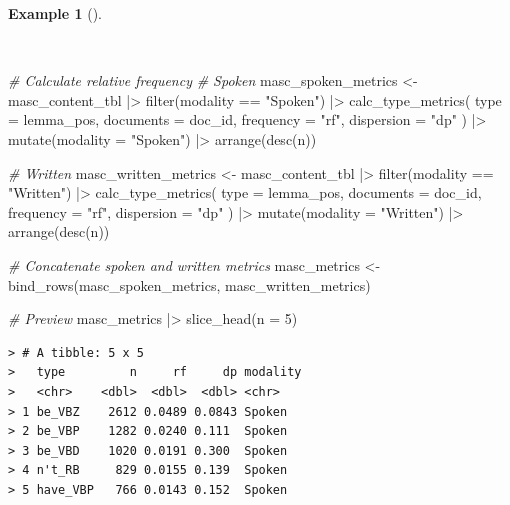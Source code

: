 \documentclass[
  letterpaper,
  DIV=11,
  numbers=noendperiod]{scrreprt}
\newenvironment{Shaded}{\begin{snugshade}}{\end{snugshade}}
\newcommand{\AttributeTok}[1]{\textcolor[rgb]{0.00,0.00,0.00}{#1}}
\newcommand{\CommentTok}[1]{\textcolor[rgb]{0.00,0.00,0.00}{\textit{#1}}}
\newcommand{\DecValTok}[1]{\textcolor[rgb]{0.00,0.00,0.00}{#1}}
\newcommand{\FunctionTok}[1]{\textcolor[rgb]{0.00,0.00,0.00}{#1}}
\newcommand{\NormalTok}[1]{\textcolor[rgb]{0.00,0.00,0.00}{#1}}
\newcommand{\OtherTok}[1]{\textcolor[rgb]{0.00,0.00,0.00}{#1}}
\newcommand{\SpecialCharTok}[1]{\textcolor[rgb]{0.00,0.00,0.00}{#1}}
\newcommand{\StringTok}[1]{\textcolor[rgb]{0.00,0.00,0.00}{#1}}
\theoremstyle{definition}
\newtheorem{example}{Example}[chapter]
\theoremstyle{remark}
\begin{document}
\begin{example}[]\protect\hypertarget{exm-eda-masc-metrics-modality}{}\label{exm-eda-masc-metrics-modality}

~

\begin{Shaded}
\begin{Highlighting}[]
\CommentTok{\# Calculate relative frequency}
\CommentTok{\# Spoken}
\NormalTok{masc\_spoken\_metrics }\OtherTok{\textless{}{-}}
\NormalTok{  masc\_content\_tbl }\SpecialCharTok{|\textgreater{}}
  \FunctionTok{filter}\NormalTok{(modality }\SpecialCharTok{==} \StringTok{"Spoken"}\NormalTok{) }\SpecialCharTok{|\textgreater{}}
  \FunctionTok{calc\_type\_metrics}\NormalTok{(}
    \AttributeTok{type =}\NormalTok{ lemma\_pos,}
    \AttributeTok{documents =}\NormalTok{ doc\_id,}
    \AttributeTok{frequency =} \StringTok{"rf"}\NormalTok{,}
    \AttributeTok{dispersion =} \StringTok{"dp"}
\NormalTok{  ) }\SpecialCharTok{|\textgreater{}}
  \FunctionTok{mutate}\NormalTok{(}\AttributeTok{modality =} \StringTok{"Spoken"}\NormalTok{) }\SpecialCharTok{|\textgreater{}}
  \FunctionTok{arrange}\NormalTok{(}\FunctionTok{desc}\NormalTok{(n))}

\CommentTok{\# Written}
\NormalTok{masc\_written\_metrics }\OtherTok{\textless{}{-}}
\NormalTok{  masc\_content\_tbl }\SpecialCharTok{|\textgreater{}}
  \FunctionTok{filter}\NormalTok{(modality }\SpecialCharTok{==} \StringTok{"Written"}\NormalTok{) }\SpecialCharTok{|\textgreater{}}
  \FunctionTok{calc\_type\_metrics}\NormalTok{(}
    \AttributeTok{type =}\NormalTok{ lemma\_pos,}
    \AttributeTok{documents =}\NormalTok{ doc\_id,}
    \AttributeTok{frequency =} \StringTok{"rf"}\NormalTok{,}
    \AttributeTok{dispersion =} \StringTok{"dp"}
\NormalTok{  ) }\SpecialCharTok{|\textgreater{}}
  \FunctionTok{mutate}\NormalTok{(}\AttributeTok{modality =} \StringTok{"Written"}\NormalTok{) }\SpecialCharTok{|\textgreater{}}
  \FunctionTok{arrange}\NormalTok{(}\FunctionTok{desc}\NormalTok{(n))}

\CommentTok{\# Concatenate spoken and written metrics}
\NormalTok{masc\_metrics }\OtherTok{\textless{}{-}}
  \FunctionTok{bind\_rows}\NormalTok{(masc\_spoken\_metrics, masc\_written\_metrics)}

\CommentTok{\# Preview}
\NormalTok{masc\_metrics }\SpecialCharTok{|\textgreater{}}
  \FunctionTok{slice\_head}\NormalTok{(}\AttributeTok{n =} \DecValTok{5}\NormalTok{)}
\end{Highlighting}
\end{Shaded}

\begin{verbatim}
> # A tibble: 5 x 5
>   type         n     rf     dp modality
>   <chr>    <dbl>  <dbl>  <dbl> <chr>   
> 1 be_VBZ    2612 0.0489 0.0843 Spoken  
> 2 be_VBP    1282 0.0240 0.111  Spoken  
> 3 be_VBD    1020 0.0191 0.300  Spoken  
> 4 n't_RB     829 0.0155 0.139  Spoken  
> 5 have_VBP   766 0.0143 0.152  Spoken
\end{verbatim}

\end{example}
\end{document}
